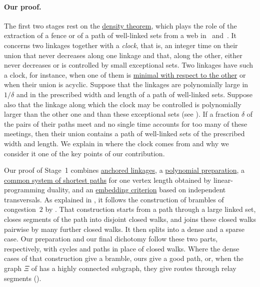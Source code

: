 \documentclass[fontsize=12pt,leading=14pt]{fullpaper}
\newcounter{step}
\begin{document}
\paragraph{Our proof.}
The first two stages rest on the \hyperref[thm:density]{density theorem}, which plays the role of the extraction of a fence or of a path of well-linked sets from a web in~\cite[Section~5]{KawarabayashiK15} and~\cite[sections~5 and~9]{HKMM26a}.
It concerns two linkages together with a \emph{clock}, that is, an integer time on their union that never decreases along one linkage and that, along the other, either never decreases or is controlled by small exceptional sets.
Two linkages have such a clock, for instance, when one of them is \hyperref[def:minimal]{minimal with respect to the other} or when their union is acyclic.
Suppose that the linkages are polynomially large in $1/\delta$ and in the prescribed width and length of a path of well-linked sets.
Suppose also that the linkage along which the clock may be controlled is polynomially larger than the other one and than these exceptional sets (see ).
If a fraction $\delta$ of the pairs of their paths meet and no single time accounts for too many of these meetings, then their union contains a path of well-linked sets of the prescribed width and length.
We explain in  where the clock comes from and why we consider it one of the key points of our contribution.

Our proof of Stage~1 combines \hyperref[def:anchored]{anchored linkages}, a \hyperref[thm:pair-preparation]{polynomial preparation}, a \hyperref[lem:geosystem]{common system of shortest paths} for one vertex length obtained by linear-programming duality, and an \hyperref[cor:weight]{embedding criterion} based on independent transversals.
As explained in , it follows the construction of brambles of congestion~$2$ by \textcite{CLNS26}.
That construction starts from a path through a large linked set, closes segments of the path into disjoint closed walks, and joins these closed walks pairwise by many further closed walks.
It then splits into a dense and a sparse case.
Our preparation and our final dichotomy follow these two parts, respectively, with cycles and paths in place of closed walks.
Where the dense cases of that construction give a bramble, ours give a good path, or, when the graph $\Xi$ of  has a highly connected subgraph, they give routes through relay segments ().
\end{document}
